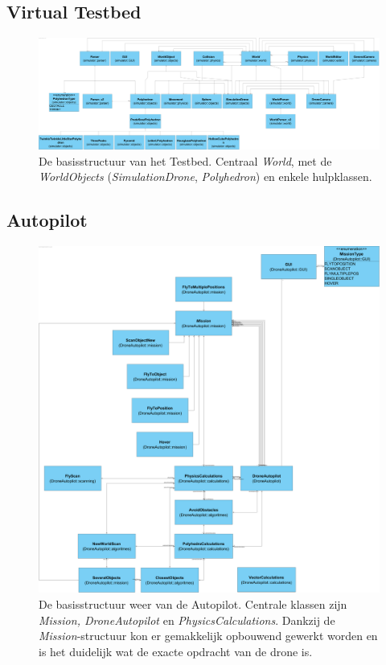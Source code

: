 \subsection{Virtual Testbed}
\begin{figure}[H]
		\begin{center}
			\includegraphics[width=1\linewidth]{Appendices/Simulator.png}
		\end{center}
		\caption{De basisstructuur van het Testbed. Centraal \textit{World}, met de \textit{WorldObjects} (\textit{SimulationDrone}, \textit{Polyhedron}) en enkele hulpklassen. }
\end{figure}
\subsection{Autopilot}
\begin{figure}[H]
		\begin{center}
			\includegraphics[width=1\linewidth]{Appendices/AP.png}
		\end{center}
		\caption{De basisstructuur weer van de Autopilot. Centrale klassen zijn \textit{Mission, DroneAutopilot} en \textit{PhysicsCalculations}. Dankzij de \textit{Mission}-structuur kon er gemakkelijk opbouwend gewerkt worden en is het duidelijk wat de exacte opdracht van de drone is.}
\end{figure}
